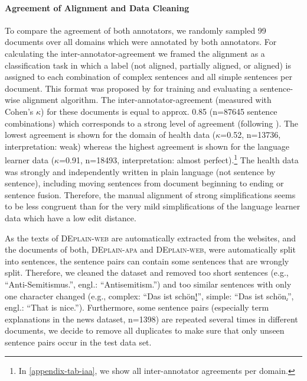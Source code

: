 \documentclass[11pt]{article}
\begin{document}
\paragraph{Agreement of Alignment and Data Cleaning}
To compare the agreement of both annotators, we randomly sampled 99 documents over all domains which were annotated by both annotators. For calculating the inter-annotator-agreement we framed the alignment as a classification task in which a label (not aligned, partially aligned, or aligned) is assigned to each combination of complex sentences and all simple sentences per document. This format was proposed by \citet{jiang-etal-2020-neural}  for training and evaluating a sentence-wise alignment algorithm. The  inter-annotator-agreement (measured with Cohen's $\kappa$) for these documents is equal to approx. 0.85 (n=87645 sentence combinations) which corresponds to a strong level of agreement (following \citet[p. 279]{mchugh2012interrater}). The lowest agreement is shown for the domain of health data ($\kappa$=0.52, n=13736, interpretation: weak) whereas the highest agreement is shown for the language learner data ($\kappa$=0.91, n=18493, interpretation: almost perfect).\footnote{In \autoref{appendix-tab-iaa}, we show all inter-annotator agreements per domain. } 
The health data was strongly and independently written in plain language (not sentence by sentence), including moving sentences from document beginning to ending or sentence fusion. Therefore, the manual alignment of strong simplifications seems to be less congruent than for the very mild simplifications of the language learner data which have a low edit distance. 

As the texts of \textsc{DEplain-web} are automatically extracted from the websites, and the documents of both, \textsc{DEplain-apa} and \textsc{DEplain-web}, were automatically split into sentences, the sentence pairs can contain some sentences that are wrongly split. Therefore, we cleaned the dataset and removed too short sentences (e.g., ``Anti-Semitismus.'', engl.: ``Antisemitism.'') and too similar sentences with only one character changed (e.g., complex: ``Das ist schön\underline{!}'', simple: ``Das ist schön\underline{.}'', engl.: ``That is nice.''). Furthermore, some sentence pairs (especially term explanations in the news dataset, n=1398) are repeated several times in different documents, we decide to remove all duplicates  to make sure that only unseen sentence pairs occur in the test data set.
\end{document}
